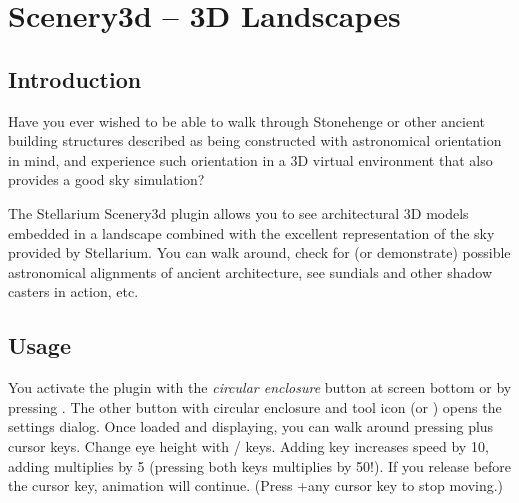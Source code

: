 


\chapter{Scenery3d -- 3D Landscapes}%
\label{ch:scenery3d}


\section{Introduction}
\label{sec:scenery3d:Introduction}


Have you ever wished to be able to walk through Stonehenge or other
ancient building structures described as being constructed with
astronomical orientation in mind, and experience such orientation in a
3D virtual environment that also provides a good sky simulation?

The Stellarium Scenery3d plugin allows you to see architectural 3D models
embedded in a landscape combined with the excellent representation of the sky
provided by Stellarium. You can walk around, check for (or
demonstrate) possible astronomical alignments of ancient architecture, see
sundials and other shadow casters in action, etc.

\section{Usage}
\label{sec:scenery3d:Usage}


You activate the plugin with the \emph{circular enclosure} button  at screen
bottom or by pressing . The other button with circular enclosure and
tool icon   (or ) opens the settings dialog. Once loaded and
displaying, you can walk around pressing \key{\ctrl} plus cursor keys. Change eye
height with / keys. Adding \key{\shift} key increases speed by 10,
adding \key{\Alt} multiplies by 5 (pressing both keys multiplies by 50!). If you release \key{\ctrl} before
the cursor key, animation will continue. (Press \key{\ctrl}+any cursor key to stop
moving.)

